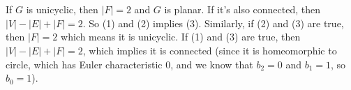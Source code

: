 \documentclass[12pt]{article}
\begin{document}
\section{}

\noindent{}\bigskip\par

If $G$ is unicyclic, then $|F|=2$ and $G$ is planar. If it's also connected, then $|V|-|E|+|F|=2$. So (1) and (2) implies (3). Similarly, if (2) and (3) are true, then $|F|=2$ which means it is unicyclic. If (1) and (3) are true, then $|V|-|E|+|F|=2$, which implies it is connected (since it is homeomorphic to  circle, which has Euler characteristic 0, and we know that $b_2=0$ and $b_1=1$, so $b_0=1$).
\end{document}
